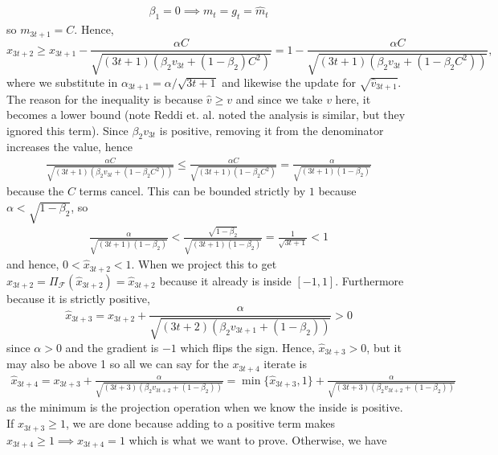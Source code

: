 \documentclass{article}
\newcommand{\1}{\mathbf{1}}                 %
\newcommand{\calF}{\mathcal{F}}
\begin{document}
\begin{align*}
\beta_1 = 0\implies m_t = g_t = \hat{m}_t
\end{align*}
so \(m_{3t+1} = C\). Hence, 
\begin{equation}
\hat{x}_{3t+2} \geq x_{3t+1} - \frac{\alpha C}{\sqrt{(3t+1)(\beta_2 v_{3t} + (1-\beta_2)C^2)}} = 1 -  \frac{\alpha C}{\sqrt{(3t+1)(\beta_2 v_{3t}+(1-\beta_2 C^2))}}, \label{eq:xhat3t1}
\end{equation}
where we substitute in \(\alpha_{3t+1} = \alpha/\sqrt{3t+1}\) and likewise the update for \(\sqrt{\hat{v}_{3t+1}}\). The reason for the inequality is because \(\hat{v}\geq v\) and since we take \(v\) here, it becomes a lower bound (note Reddi et. al. noted the analysis is similar, but they ignored this term). Since \(\beta_2v_{3t}\) is positive, removing it from the denominator increases the value, hence 
\begin{align*}
    \frac{\alpha C}{\sqrt{(3t+1)(\beta_2 v_{3t}+(1-\beta_2 C^2))}} \leq \frac{\alpha C}{\sqrt{(3t+1)(1-\beta_2 C^2)}} =  \frac{\alpha}{\sqrt{(3t+1)(1-\beta_2)}}
\end{align*}
because the \(C\) terms cancel. This can be bounded strictly by \(1\) because \(\alpha<\sqrt{1-\beta_2}\), so 
\begin{align*}
    \frac{\alpha}{\sqrt{(3t+1)(1-\beta_2)}} < \frac{\sqrt{1-\beta_2}}{\sqrt{(3t+1)(1-\beta_2)}} = \frac{1}{\sqrt{3t+1}} < 1
\end{align*}
and hence, \(0<\hat{x}_{3t+2}<1\). When we project this to get \(x_{3t+2}=\Pi_\calF(\hat{x}_{3t+2}) = \hat{x}_{3t+2}\) because it already is inside \([-1,1]\). Furthermore because it is strictly positive, 
\begin{equation}
\hat{x}_{3t+3} = x_{3t+2} + \frac{\alpha}{\sqrt{(3t+2)(\beta_2 v_{3t+1}+(1-\beta_2))}} > 0 \label{eq:xhat3t2}
\end{equation}
since \(\alpha>0\) and the gradient is \(-1\) which flips the sign. Hence, \(\hat{x}_{3t+3}>0\), but it may also be above 1 so all we can say for the \(x_{3t+4}\) iterate is 
\begin{align*}
\hat{x}_{3t+4} = x_{3t+3} + \frac{\alpha}{\sqrt{(3t+3)(\beta_2v_{3t+2}+(1-\beta_2))}} = \min\{\hat{x}_{3t+3},1\} + \frac{\alpha}{\sqrt{(3t+3)(\beta_2v_{3t+2}+(1-\beta_2))}}
\end{align*}
as the minimum is the projection operation when we know the inside is positive. If \(\hat{x}_{3t+3}\geq 1\), we are done because adding to a positive term makes \(\hat{x}_{3t+4}\geq 1 \implies x_{3t+4}=1\) which is what we want to prove. Otherwise, we have 
\end{document}
